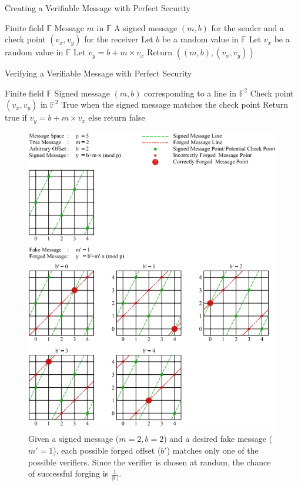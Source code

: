 \documentclass{dalcsthesis}
\begin{document}
\begin{algorithm}
  \caption{Creating a Verifiable Message with Perfect Security}
  \label{alg:CreatingVerifiableMessageForUnbounded}
  \begin{algorithmic}
    \INPUT Finite field $\mathbb{F}$
    \INPUT Message $m$ in $\mathbb{F}$
    \OUTPUT A signed message $(m, b)$ for the sender and a check point $(v_x, v_y)$ for the receiver
    \STATE Let $b$ be a random value in $\mathbb{F}$ 
    \STATE Let $v_x$ be a random value in $\mathbb{F}$
    \STATE Let $v_y = b + m \times v_x$
    \STATE Return $((m, b), (v_x, v_y))$
  \end{algorithmic}
\end{algorithm}
\begin{algorithm}
  \caption{Verifying a Verifiable Message with Perfect Security}
  \label{alg:VerifyMessageForUnbounded}
  \begin{algorithmic}
    \INPUT Finite field $\mathbb{F}$
    \INPUT Signed message $(m, b)$ corresponding to a line in $\mathbb{F}^2$
    \INPUT Check point $(v_x, v_y)$ in $\mathbb{F}^2$
    \OUTPUT True when the signed message matches the check point
    \STATE Return true if $v_y = b + m \times v_x$ else return false
  \end{algorithmic}
\end{algorithm}

\begin{figure}
\includegraphics[width=\textwidth]{../../Graphics/PointAndLineExample.png}
\caption{Given a signed message ($m=2, b=2$) and a desired fake message ($m'=1$), each possible forged offset ($b'$) matches only one of the possible verifiers. Since the verifier is chosen at random, the chance of successful forging is $\frac{1}{|\mathbb{F}|}$.}
\label{img:ForgingVerifiableMessageForUnbounded}
\end{figure}
\end{document}
